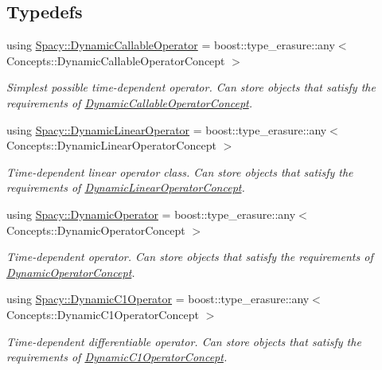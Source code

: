 \subsection*{Typedefs}
\begin{DoxyCompactItemize}
\item 
using \hyperlink{group__SpacyGroup_ga750d55072f7a3a16a1263961147333c0_ga750d55072f7a3a16a1263961147333c0}{Spacy\+::\+Dynamic\+Callable\+Operator} = boost\+::type\+\_\+erasure\+::any$<$ Concepts\+::\+Dynamic\+Callable\+Operator\+Concept $>$
\begin{DoxyCompactList}\small\item\em Simplest possible time-\/dependent operator. Can store objects that satisfy the requirements of \hyperlink{group__ConceptGroup_ga30692db093ead5a1a074905363a2f043_DynamicCallableOperatorConceptAnchor}{Dynamic\+Callable\+Operator\+Concept}. \end{DoxyCompactList}\item 
using \hyperlink{group__SpacyGroup_gaad10aa7d5443703377b768fa41a3c7ea_gaad10aa7d5443703377b768fa41a3c7ea}{Spacy\+::\+Dynamic\+Linear\+Operator} = boost\+::type\+\_\+erasure\+::any$<$ Concepts\+::\+Dynamic\+Linear\+Operator\+Concept $>$
\begin{DoxyCompactList}\small\item\em Time-\/dependent linear operator class. Can store objects that satisfy the requirements of \hyperlink{group__ConceptGroup_ga015b0d099011a2ef73a16aa9b36a7346_DynamicLinearOperatorConceptAnchor}{Dynamic\+Linear\+Operator\+Concept}. \end{DoxyCompactList}\item 
using \hyperlink{group__SpacyGroup_ga8e692134dfe46346d5692acfd1a9bd8e_ga8e692134dfe46346d5692acfd1a9bd8e}{Spacy\+::\+Dynamic\+Operator} = boost\+::type\+\_\+erasure\+::any$<$ Concepts\+::\+Dynamic\+Operator\+Concept $>$
\begin{DoxyCompactList}\small\item\em Time-\/dependent operator. Can store objects that satisfy the requirements of \hyperlink{group__ConceptGroup_ga2c979d268f0ca7a436776a9631d10af7_DynamicOperatorConceptAnchor}{Dynamic\+Operator\+Concept}. \end{DoxyCompactList}\item 
using \hyperlink{group__SpacyGroup_gabc9c830d2a7e020bcab097b10ee6f642_gabc9c830d2a7e020bcab097b10ee6f642}{Spacy\+::\+Dynamic\+C1\+Operator} = boost\+::type\+\_\+erasure\+::any$<$ Concepts\+::\+Dynamic\+C1\+Operator\+Concept $>$
\begin{DoxyCompactList}\small\item\em Time-\/dependent differentiable operator. Can store objects that satisfy the requirements of \hyperlink{group__ConceptGroup_gaa7ef0ce2d66b0610035541b580564b11_DynamicC1OperatorConceptAnchor}{Dynamic\+C1\+Operator\+Concept}. \end{DoxyCompactList}\item 

\end{DoxyCompactItemize}
